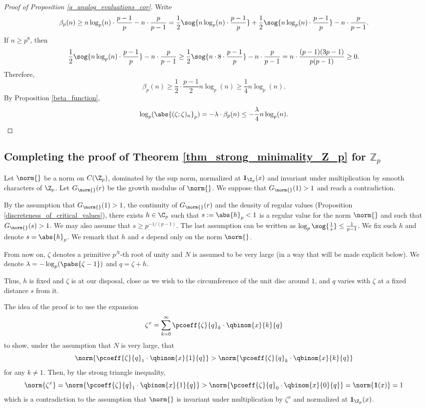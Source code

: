     \begin{proof}[Proof of Proposition \ref{q_analog_evaluations_cor}]
    Write
    \[\beta_p(n)\geq n\log_p(n)\cdot\frac{p-1}{p}-n\cdot\frac{p}{p-1}
    =\frac{1}{2}\sog{n\log_p(n)\cdot\frac{p-1}{p}}+\frac{1}{2}\sog{n\log_p(n)\cdot\frac{p-1}{p}}-n\cdot\frac{p}{p-1}.\]
    If $n\geq p^8$, then
    \[\frac{1}{2}\sog{n\log_p(n)\cdot\frac{p-1}{p}}-n\cdot\frac{p}{p-1}
    \geq\frac{1}{2} \sog{n\cdot 8\cdot\frac{p-1}{p}}-n\cdot\frac{p}{p-1}
    =n\cdot\frac{(p-1)(3p-1)}{p(p-1)}\geq 0.\]
    Therefore, 
    \[\beta_p(n)\geq  \frac{1}{2}\cdot\frac{p-1}{2}n\log_p(n)\geq \frac{1}{4}n\log_p(n).\]
    By Proposition \ref{beta_function},
    \[\log_{p}(\abs{(\zeta;\zeta)_n}_p)=-\lambda\cdot\beta_p(n)\leq -\frac{\lambda}{4}n\log_p(n).\]
    \end{proof} 

\subsection{Completing the proof of Theorem \ref{thm_strong_minimality_Z_p} for $\mathbb{Z}_p$}
Let $\norm{}$ be a norm on $C(\Z_p)$, dominated by the sup norm, normalized at $\textbf{1}_{\Z_p}(x)$ and invariant under multiplication by smooth characters of $\Z_p$.
Let $G_{\norm{}}(r)$ be the growth modulus of $\norm{}$.
We suppose that $G_{\norm{}}(1)>1$ and reach a contradiction.

By the assumption that $G_{\norm{}}(1)>1$, the continuity of $G_{\norm{}}(r)$ and the density of regular values (Proposition \ref{discreteness_of_critical_values}), there exists $h\in \C_p$ such that $s:=\abs{h}_p<1$ is a regular value for the norm $\norm{}$ and such that $G_{\norm{}}(s)>1$.
We may also assume that $s\geq p^{-1/(p-1)}$.
The last assumption can be written as $\log_p\sog{\frac{1}{s}}\leq \frac{1}{p-1}$.
We fix such $h$ and denote $s=\abs{h}_p$.
We remark that $h$ and $s$ depend only on the norm $\norm{}$.

From now on, $\zeta$ denotes a primitive $p^N$-th root of unity and $N$ is assumed to be very large (in a way that will be made explicit below).
We denote $\lambda=-\log_p(\pabs{\zeta-1})$ and $q=\zeta+h$.

Thus, $h$ is fixed and $\zeta$ is at our disposal, close as we wish to the circumference of the unit disc around $1$, and $q$ varies with $\zeta$ at a fixed distance $s$ from it.

The idea of the proof is to use the expansion 
\[\zeta^x=\sum_{k=0}^\infty\pcoeff{\zeta}{q}_k\cdot\qbinom{x}{k}{q}\]
to show, under the assumption that $N$ is very large, that
    \begin{equation}\label{main_inequality}
    \norm{\pcoeff{\zeta}{q}_1\cdot\qbinom{x}{1}{q}}
    >\norm{\pcoeff{\zeta}{q}_k\cdot\qbinom{x}{k}{q}}  
    \end{equation} 
for any $k\neq 1$.
Then, by the strong triangle inequality,
\[\norm{\zeta^x}
=\norm{\pcoeff{\zeta}{q}_1\cdot\qbinom{x}{1}{q}}
>\norm{\pcoeff{\zeta}{q}_0\cdot\qbinom{x}{0}{q}}
=\norm{\textbf{1}(x)}
=1\] 
which is a contradiction to the assumption that $\norm{}$ is invariant under multiplication by $\zeta^x$ and normalized at $\textbf{1}_{\Z_p}(x)$.

